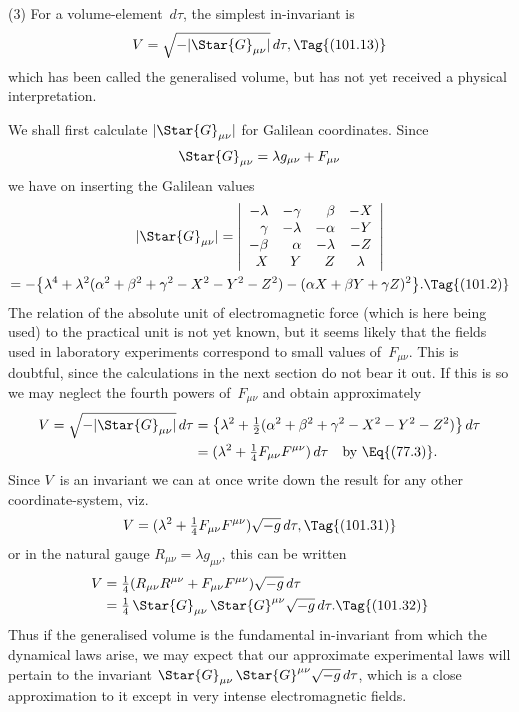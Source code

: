 \documentclass[12pt]{book}
\begin{document}
(3) For a volume\hyp{}element~$d\tau$, the simplest in\hyp{}invariant is
\[
V = \sqrt{-|\Star{G}_{\mu\nu}|}\, d\tau,
\Tag{(101.13)}
\]
which has been called the generalised volume, but has not yet received a
physical interpretation.

We shall first calculate $|\Star{G}_{\mu\nu}|$ for Galilean coordinates. Since
\[
\Star{G}_{\mu\nu} = \lambda g_{\mu\nu} + F_{\mu\nu}
\]
we have on inserting the Galilean values
\begin{multline*}
  |\Star{G}_{\mu\nu}|
  = \left\lvert
  \begin{array}{r@{\quad}r@{\quad}r@{\quad}c}
  -\lambda & -\gamma & \beta & -X \\
  \gamma & -\lambda & -\alpha & -Y \\
  -\beta & \alpha & -\lambda & -Z \\
  X & Y & Z & \lambda \\
  \end{array}\right\rvert \\
  = -\bigl\{\lambda^{4}
  + \lambda^2(\alpha^2 + \beta^2 + \gamma^2 - X^{2} - Y^{2} - Z^{2})
  - (\alpha X + \beta Y + \gamma Z)^{2}\bigr\}.
  \Tag{(101.2)}
\end{multline*}
The relation of the absolute unit of electromagnetic force (which is here being
used) to the practical unit is not yet known, but it seems likely that the fields
used in laboratory experiments correspond to small values of~$F_{\mu\nu}$\footnotemark.\footnotetext
  {This is doubtful, since the calculations in the next section do not bear it out.}
If this is
so we may neglect the fourth powers of~$F_{\mu\nu}$ and obtain approximately
\begin{align*}
  V = \sqrt{-|\Star{G}_{\mu\nu}|}\, d\tau
  &= \bigl\{\lambda^2 + \tfrac{1}{2}(\alpha^2 + \beta^2 + \gamma^2 - X^{2} - Y^{2} - Z^{2})\bigr\}\, d\tau \\
  &= (\lambda^2 + \tfrac{1}{4} F_{\mu\nu} F^{\mu\nu})\, d\tau
  \quad\text{by~\Eq{(77.3)}.}
\end{align*}
Since $V$~is an invariant we can at once write down the result for any other
coordinate\hyp{}system, viz.\
\[
V = (\lambda^2 + \tfrac{1}{4} F_{\mu\nu} F^{\mu\nu}) \sqrt{-g}\, d\tau,
\Tag{(101.31)}
\]
or in the natural gauge $R_{\mu\nu} = \lambda g_{\mu\nu}$, this can be written
\begin{align*}
V &= \tfrac{1}{4} (R_{\mu\nu} R^{\mu\nu} + F_{\mu\nu} F^{\mu\nu}) \sqrt{-g}\, d\tau \\
&= \tfrac{1}{4}\, \Star{G}_{\mu\nu}\, \Star{G}^{\mu\nu} \sqrt{-g}\, d\tau.
\Tag{(101.32)}
\end{align*}
Thus if the generalised volume is the fundamental in\hyp{}invariant from which
the dynamical laws arise, we may expect that our approximate experimental
laws will pertain to the invariant $\Star{G}_{\mu\nu}\, \Star{G}^{\mu\nu} \sqrt{-g}\, d\tau$, which is a close approximation
to it except in very intense electromagnetic fields.
\end{document}
